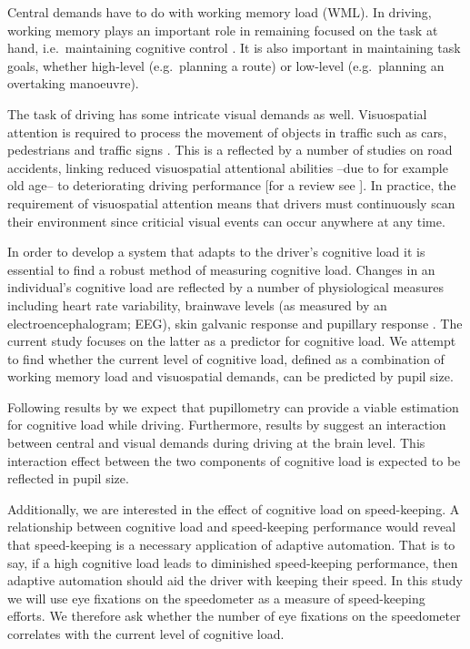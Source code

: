 Central demands have to do with working memory load (WML).
In driving, working memory plays an important role in remaining focused on the task at hand, i.e.\ maintaining cognitive control \citep{Wood2016}.
It is also important in maintaining task goals, whether high-level (e.g.\ planning a route) or low-level (e.g.\ planning an overtaking manoeuvre).

The task of driving has some intricate visual demands as well.
Visuospatial attention is required to process the movement of objects in traffic such as cars, pedestrians and traffic signs \citep{Zheng2020}.
This is a reflected by a number of studies on road accidents, linking reduced visuospatial attentional abilities --due to for example old age-- to deteriorating driving performance [for a review see \citealp{Owsley2010}].
In practice, the requirement of visuospatial attention means that drivers must continuously scan their environment since criticial visual events can occur anywhere at any time.

In order to develop a system that adapts to the driver's cognitive load it is essential to find a robust method of measuring cognitive load.
Changes in an individual's cognitive load are reflected by a number of physiological measures including heart rate variability, brainwave levels (as measured by an electroencephalogram; EEG), skin galvanic response and pupillary response \citep{Haapalainen2010}.
The current study focuses on the latter as a predictor for cognitive load. We attempt to find whether the current level of cognitive load, defined as a combination of working memory load and visuospatial demands, can be predicted by pupil size.

Following results by \citet{Palinko2010} we expect that pupillometry can provide a viable estimation for cognitive load while driving. 
Furthermore, results by \citet{Scheunemann2019} suggest an interaction between central and visual demands during driving at the brain level.
This interaction effect between the two components of cognitive load is expected to be reflected in pupil size.

Additionally, we are interested in the effect of cognitive load on speed-keeping.
A relationship between cognitive load and speed-keeping performance would reveal that speed-keeping is a necessary application of adaptive automation. 
That is to say, if a high cognitive load leads to diminished speed-keeping performance, then adaptive automation should aid the driver with keeping their speed.
In this study we will use eye fixations on the speedometer as a measure of speed-keeping efforts. We therefore ask whether the number of eye fixations on the speedometer correlates with the current level of cognitive load.

